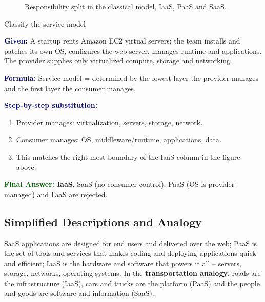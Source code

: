 \documentclass[11pt,a4paper,openany]{report}
\newcommand{\Given}{\par\textbf{\textcolor{navy}{Given:}} }
\newcommand{\Formula}{\par\textbf{\textcolor{navy}{Formula:}} }
\newcommand{\Steps}{\par\textbf{\textcolor{navy}{Step-by-step substitution:}}\par}
\newcommand{\Answer}{\par\textbf{\textcolor{darkgreen}{Final Answer:}} }
\begin{document}
\begin{figure}[H]
\centering
{}
\caption{Responsibility split in the classical model, IaaS, PaaS and SaaS.}
\end{figure}

\begin{solved}{Classify the service model}
\Given A startup rents Amazon EC2 virtual servers; the team installs and patches its own OS,
configures the web server, manages runtime and applications. The provider supplies only
virtualized compute, storage and networking.
\Formula Service model = determined by the lowest layer the provider manages and the first layer the
consumer manages.
\Steps
\begin{enumerate}[leftmargin=*]
  \item Provider manages: virtualization, servers, storage, network.
  \item Consumer manages: OS, middleware/runtime, applications, data.
  \item This matches the right-most boundary of the IaaS column in the figure above.
\end{enumerate}
\Answer \textbf{IaaS}. SaaS (no consumer control), PaaS (OS is provider-managed) and FaaS are rejected.
\end{solved}

\subsection{Simplified Descriptions and Analogy}
SaaS applications are designed for end users and delivered over the web; PaaS is the set of tools
and services that makes coding and deploying applications quick and efficient; IaaS is the hardware
and software that powers it all -- servers, storage, networks, operating systems. In the
\textbf{transportation analogy}, roads are the infrastructure (IaaS), cars and trucks are the platform
(PaaS) and the people and goods are software and information (SaaS).
\end{document}
